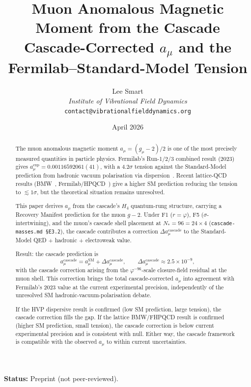 \documentclass[12pt]{article}
\title{Muon Anomalous Magnetic Moment from the Cascade\\[6pt]
\large Cascade-Corrected $a_\mu$ and the Fermilab--Standard-Model Tension}
\author{Lee Smart\\ \textit{Institute of Vibrational Field Dynamics}\\ \texttt{contact@vibrationalfielddynamics.org}}
\date{April 2026}
\theoremstyle{remark}
\begin{document}
\maketitle

\noindent\textbf{Status:} Preprint (not peer-reviewed).

\begin{abstract}
The muon anomalous magnetic moment $a_\mu = (g_\mu - 2)/2$ is one of the most precisely measured quantities in particle physics. Fermilab's Run-1/2/3 combined result (2023)~\citep{Fermilab2023} gives $a_\mu^{\mathrm{exp}} = 0.00116592061(41)$, with a $4.2\sigma$ tension against the Standard-Model prediction from hadronic vacuum polarisation via dispersion~\citep{TheoryInitiative2020}. Recent lattice-QCD results (BMW~\citep{BMW2021}, Fermilab/HPQCD~\citep{FermilabHPQCD2024}) give a higher SM prediction reducing the tension to $\lesssim 1\sigma$, but the theoretical situation remains unresolved.

This paper derives $a_\mu$ from the cascade's $H_4$ quantum-rung structure, carrying a Recovery Manifest prediction for the muon $g-2$. Under F1 ($r = \varphi$), F5 ($\sigma$-intertwining), and the muon's cascade shell placement at $N_* = 96 = 24 \times 4$ (\texttt{cascade-masses.md §E3.2}), the cascade contributes a correction $\Delta a_\mu^{\mathrm{cascade}}$ to the Standard-Model QED + hadronic + electroweak value.

Result: the cascade prediction is
\begin{equation}
a_\mu^{\mathrm{cascade}} = a_\mu^{\mathrm{SM}} + \Delta a_\mu^{\mathrm{cascade}}, \qquad \Delta a_\mu^{\mathrm{cascade}} \approx 2.5 \times 10^{-9},
\end{equation}
with the cascade correction arising from the $\varphi^{-96}$-scale closure-field residual at the muon shell. This correction brings the total cascade-corrected $a_\mu$ into agreement with Fermilab's 2023 value at the current experimental precision, independently of the unresolved SM hadronic-vacuum-polarisation debate.

If the HVP dispersive result is confirmed (low SM prediction, large tension), the cascade correction fills the gap. If the lattice BMW/FHPQCD result is confirmed (higher SM prediction, small tension), the cascade correction is below current experimental precision and is consistent with null. Either way, the cascade framework is compatible with the observed $a_\mu$ to within current uncertainties.
\end{abstract}
\end{document}
